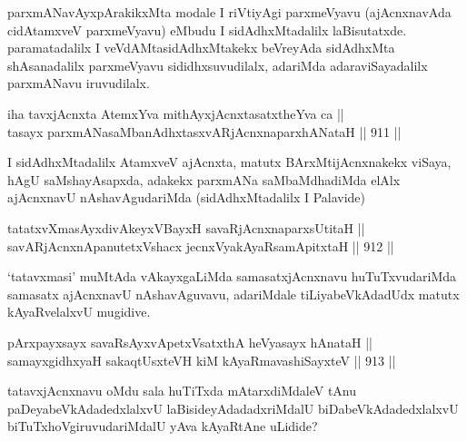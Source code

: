 \begin{artha}
parxmANavAyxpArakikxMta modale I riVtiyAgi parxmeVyavu (ajAcnxnavAda cidAtamxveV parxmeVyavu) eMbudu I sidAdhxMtadalilx laBisutatxde. paramatadalilx I veVdAMtasidAdhxMtakekx beVreyAda sidAdhxMta shAsanadalilx parxmeVyavu sididhxsuvudilalx, adariMda adaraviSayadalilx parxmANavu iruvudilalx.
\end{artha}


\begin{shl}
iha tavxjAcnxta AtemxYva mithAyxjAcnxtasatxtheYva ca || \\
tasayx parxmANasaMbanAdhxtasxvARjAcnxnaparxhANataH \hfill || 911 ||  
\end{shl}

\begin{artha}
I sidAdhxMtadalilx AtamxveV ajAcnxta, matutx BArxMtijAcnxnakekx viSaya, hAgU saMshayAsapxda, adakekx parxmANa saMbaMdhadiMda elAlx ajAcnxnavU nAshavAgudariMda (sidAdhxMtadalilx I Palavide)
\end{artha}

\begin{shl}
tatatxvXmasAyxdivAkeyxVBayxH \footnotemark[1]savaRjAcnxnaparxsUtitaH || \\
savARjAcnxnApanutetxVshacx jecnxVyakAyaRsamApitxtaH \hfill || 912 ||  
\end{shl}

\begin{artha}
`tatavxmasi' muMtAda vAkayxgaLiMda samasatxjAcnxnavu huTuTxvudariMda samasatx ajAcnxnavU nAshavAguvavu, adariMdale tiLiyabeVkAdadUdx matutx kAyaRvelalxvU mugidive.
\end{artha}


\begin{shl}
pArxpayxsayx savaRsAyxvApetxVsatxthA heVyasayx hAnataH || \\
samayxgidhxyaH sakaqtUsxteVH kiM kAyaRmavashiSayxteV \hfill || 913 ||  
\end{shl}

\begin{artha}
tatavxjAcnxnavu oMdu sala huTiTxda mAtarxdiMdaleV tAnu paDeyabeVkAdadedxlalxvU laBisideyAdadadxriMdalU biDabeVkAdadedxlalxvU biTuTxhoVgiruvudariMdalU yAva kAyaRtAne uLidide?
\end{artha}

